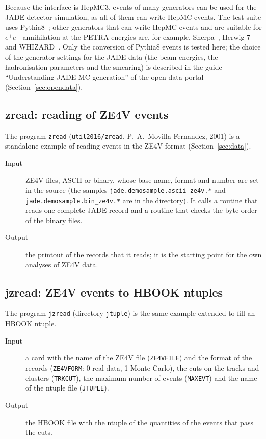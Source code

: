 Because the interface is HepMC3, events of many generators can be used for the JADE detector simulation, as all of them can write HepMC events. The test suite uses
Pythia8~\cite{Bierlich:2022pfr}; other generators that can write HepMC events and are suitable for $e^+e^-$ annihilation at the PETRA energies are, for example,
Sherpa~\cite{Bothmann:2019yzt,Sherpa:2024mfk}, Herwig 7~\cite{Bellm:2015jjp,Bewick:2023tfi} and WHIZARD~\cite{Kilian:2007gr}. Only the conversion of Pythia8 events is
tested here; the choice of the generator settings for the JADE data (the beam energies, the hadronisation parameters and the smearing) is described in the guide
``Understanding JADE MC generation'' of the open data portal (Section~\ref{sec:opendata}).

\subsection{zread: reading of ZE4V events}
The program \texttt{zread} (\texttt{util2016/\allowbreak{}zread}, P.~A.~Movilla Fernandez, 2001) is a standalone example of reading events in the ZE4V format (Section~\ref{sec:data}).
\begin{description}
\item[Input] ZE4V files, ASCII or binary, whose base name, format and number are set in the source (the samples \texttt{jade.demosample.ascii\_\allowbreak{}ze4v.*} and
\texttt{jade.demosample.bin\_\allowbreak{}ze4v.*} are in the directory). It calls a routine that reads one complete JADE record and a routine that checks the byte order of the binary files.
\item[Output] the printout of the records that it reads; it is the starting point for the own analyses of ZE4V data.
\end{description}

\subsection{jzread: ZE4V events to HBOOK ntuples}
The program \texttt{jzread} (directory \texttt{jtuple}) is the same example extended to fill an HBOOK ntuple.
\begin{description}
\item[Input] a card with the name of the ZE4V file (\texttt{ZE4VFILE}) and the format of the records (\texttt{ZE4VFORM}: 0 real data, 1 Monte Carlo), the cuts on the tracks and
clusters (\texttt{TRKCUT}), the maximum number of events (\texttt{MAXEVT}) and the name of the ntuple file (\texttt{JTUPLE}).
\item[Output] the HBOOK file with the ntuple of the quantities of the events that pass the cuts.
\end{description}

